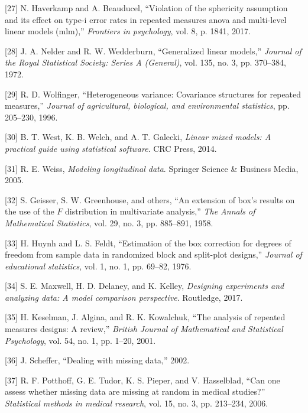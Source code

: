 \documentclass[
]{article}
\begin{document}
\leavevmode\hypertarget{ref-haverkamp2017}{}%
{[}27{]} N. Haverkamp and A. Beauducel, ``Violation of the sphericity assumption and its effect on type-i error rates in repeated measures anova and multi-level linear models (mlm),'' \emph{Frontiers in psychology}, vol. 8, p. 1841, 2017.

\leavevmode\hypertarget{ref-nelder1972}{}%
{[}28{]} J. A. Nelder and R. W. Wedderburn, ``Generalized linear models,'' \emph{Journal of the Royal Statistical Society: Series A (General)}, vol. 135, no. 3, pp. 370--384, 1972.

\leavevmode\hypertarget{ref-wolfinger1996}{}%
{[}29{]} R. D. Wolfinger, ``Heterogeneous variance: Covariance structures for repeated measures,'' \emph{Journal of agricultural, biological, and environmental statistics}, pp. 205--230, 1996.

\leavevmode\hypertarget{ref-west2014}{}%
{[}30{]} B. T. West, K. B. Welch, and A. T. Galecki, \emph{Linear mixed models: A practical guide using statistical software}. CRC Press, 2014.

\leavevmode\hypertarget{ref-weiss2005}{}%
{[}31{]} R. E. Weiss, \emph{Modeling longitudinal data}. Springer Science \& Business Media, 2005.

\leavevmode\hypertarget{ref-geisser1958}{}%
{[}32{]} S. Geisser, S. W. Greenhouse, and others, ``An extension of box's results on the use of the \(F\) distribution in multivariate analysis,'' \emph{The Annals of Mathematical Statistics}, vol. 29, no. 3, pp. 885--891, 1958.

\leavevmode\hypertarget{ref-huynh1976}{}%
{[}33{]} H. Huynh and L. S. Feldt, ``Estimation of the box correction for degrees of freedom from sample data in randomized block and split-plot designs,'' \emph{Journal of educational statistics}, vol. 1, no. 1, pp. 69--82, 1976.

\leavevmode\hypertarget{ref-maxwell2017}{}%
{[}34{]} S. E. Maxwell, H. D. Delaney, and K. Kelley, \emph{Designing experiments and analyzing data: A model comparison perspective}. Routledge, 2017.

\leavevmode\hypertarget{ref-keselman2001}{}%
{[}35{]} H. Keselman, J. Algina, and R. K. Kowalchuk, ``The analysis of repeated measures designs: A review,'' \emph{British Journal of Mathematical and Statistical Psychology}, vol. 54, no. 1, pp. 1--20, 2001.

\leavevmode\hypertarget{ref-scheffer2002}{}%
{[}36{]} J. Scheffer, ``Dealing with missing data,'' 2002.

\leavevmode\hypertarget{ref-potthoff2006}{}%
{[}37{]} R. F. Potthoff, G. E. Tudor, K. S. Pieper, and V. Hasselblad, ``Can one assess whether missing data are missing at random in medical studies?'' \emph{Statistical methods in medical research}, vol. 15, no. 3, pp. 213--234, 2006.
\end{document}
